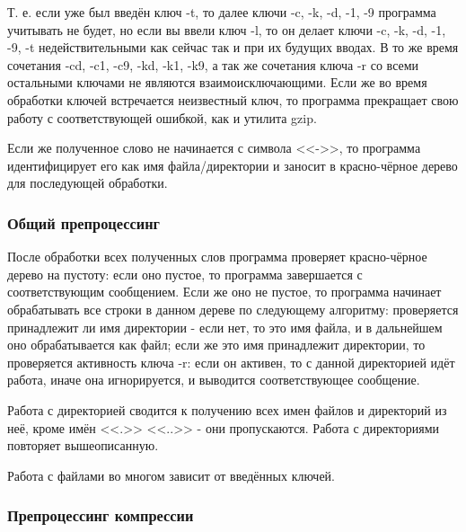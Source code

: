 \documentclass[12pt]{article}
\begin{document}
Т. е. если уже был введён ключ -t, то далее ключи -c, -k, -d, -1, -9 программа учитывать не будет, но если вы ввели ключ -l, то он делает ключи -c, -k, -d, -1, -9, -t недействительными как сейчас так и при их будущих вводах. В то же время сочетания -cd, -c1, -c9, -kd, -k1, -k9, а так же сочетания ключа -r со всеми остальными ключами не являются взаимоисключающими. Если же во время обработки ключей встречается неизвестный ключ, то программа прекращает свою работу с соответствующей ошибкой, как и утилита gzip.

Если же полученное слово не начинается с символа <<->>, то программа идентифицирует его как имя файла/директории и заносит в красно-чёрное дерево для последующей обработки.

\subsubsection*{Общий препроцессинг}

После обработки всех полученных слов программа проверяет красно-чёрное дерево на пустоту: если оно пустое, то программа завершается с соответствующим сообщением. Если же оно не пустое, то программа начинает обрабатывать все строки в данном дереве по следующему алгоритму: проверяется принадлежит ли имя директории - если нет, то это имя файла, и в дальнейшем оно обрабатывается как файл; если же это имя принадлежит директории, то проверяется активность ключа -r: если он активен, то с данной директорией идёт работа, иначе она игнорируется, и выводится соответствующее сообщение.

Работа с директорией сводится к получению всех имен файлов и директорий из неё, кроме имён <<.>> <<..>> - они пропускаются. Работа с директориями повторяет вышеописанную.

Работа с файлами во многом зависит от введённых ключей. 

\subsubsection*{Препроцессинг компрессии}
\end{document}
